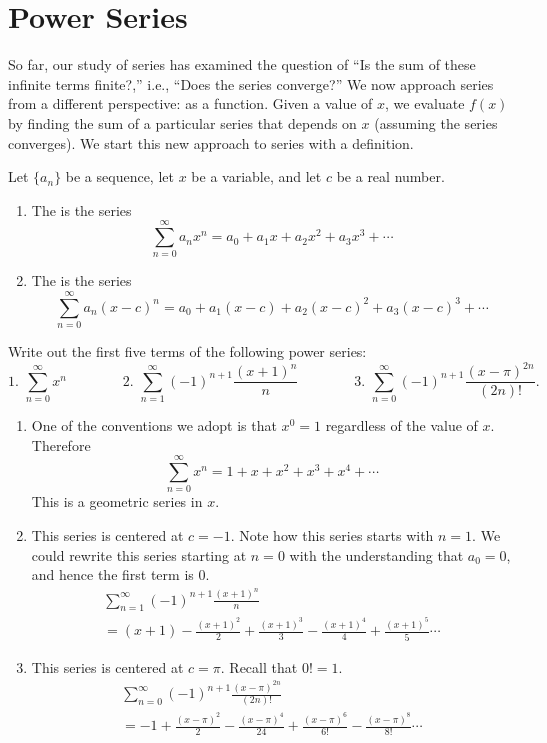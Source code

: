 \section{Power Series}\label{sec:power_series}

So far, our study of series has examined the question of ``Is the sum of these infinite terms finite?,'' i.e., ``Does the series converge?'' We now approach series from a different perspective: as a function. Given a value of $x$, we evaluate $f(x)$ by finding the sum of a particular series that depends on $x$ (assuming the series converges). We start this new approach to series with a definition.

\begin{definition}\label{def:power_series}
Let $\{a_n\}$ be a sequence, let $x$ be a variable, and let $c$ be a real number.
	\begin{enumerate}
		\item The  is the series
		\[\sum_{n=0}^\infty a_nx^n = a_0+a_1x+a_2x^2+a_3x^3+\dotsb\]
		
		\item The  is the series
		\[\sum_{n=0}^\infty a_n(x-c)^n = a_0+a_1(x-c)+a_2(x-c)^2+a_3(x-c)^3+\dotsb\]
	\end{enumerate}
\end{definition}

\begin{example}\label{ex_ps1}
Write out the first five terms of the following power series:
\[
 \text{1. }\sum_{n=0}^\infty x^n \qquad\qquad
 \text{2. }\sum_{n=1}^\infty (-1)^{n+1}\frac{(x+1)^n}n\qquad\qquad
 \text{3. }\sum_{n=0}^\infty (-1)^{n+1} \frac{(x-\pi)^{2n}}{(2n)!}.
\]
\solution
\begin{enumerate}
	\item One of the conventions we adopt is that $x^0=1$ regardless of the value of $x$. Therefore
	\[\sum_{n=0}^\infty x^n = 1+x+x^2+x^3+x^4+\dotsb\]
	This is a geometric series in $x$.
	
	\item	This series is centered at $c=-1$. Note how this series starts with $n=1$. We could rewrite this series starting at $n=0$ with the understanding that $a_0=0$, and hence the first term is $0$.
	\begin{multline*}
	\sum_{n=1}^\infty (-1)^{n+1}\frac{(x+1)^n}n \\
	= (x+1) - \frac{(x+1)^2}{2} + \frac{(x+1)^3}{3} - \frac{(x+1)^4}{4}+\frac{(x+1)^5}{5}\dotsb
	\end{multline*}
	
	\item	This series is centered at $c=\pi$. Recall that $0!=1$.
	\begin{multline*}
	\sum_{n=0}^\infty (-1)^{n+1} \frac{(x-\pi)^{2n}}{(2n)!}\\
	= -1+\frac{(x-\pi)^2}{2} - \frac{(x-\pi)^4}{24}+ \frac{(x-\pi)^6}{6!}-\frac{(x-\pi)^8}{8!}\dotsb
	\end{multline*}
\end{enumerate}
\end{example}

